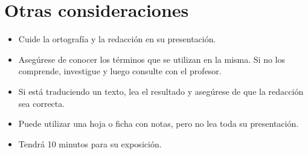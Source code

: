 \documentclass[letterpaper,10pt]{article}
\begin{document}
\section{Otras consideraciones}
\begin{small}
\begin{itemize}
\item Cuide la ortografía y la redacción en su presentación.
\item Asegúrese de conocer los términos que se utilizan en la misma. Si no los comprende, investigue y luego consulte con el profesor.
\item Si está traduciendo un texto, lea el resultado y asegúrese de que la redacción sea correcta.
\item Puede utilizar una hoja o ficha con notas, pero no lea toda su presentación.
\item Tendrá 10 minutos para su exposición. 
\end{itemize}
\end{small}
\end{document}
